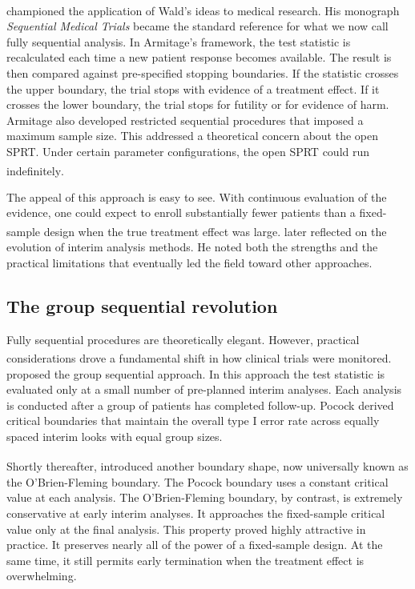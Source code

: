 \documentclass[
  11pt,
]{article}
\begin{document}
\textsuperscript{} championed the application of
Wald's ideas to medical research. His monograph
\emph{Sequential Medical Trials} became the standard
reference for what we now call fully sequential
analysis. In Armitage's framework, the test statistic
is recalculated each time a new patient response
becomes available. The result is then compared against
pre-specified stopping boundaries. If the statistic
crosses the upper boundary, the trial stops with
evidence of a treatment effect. If it crosses the lower
boundary, the trial stops for futility or for evidence
of harm. Armitage also developed restricted sequential
procedures that imposed a maximum sample size. This
addressed a theoretical concern about the open SPRT.
Under certain parameter configurations, the open SPRT
could run indefinitely\textsuperscript{}.

The appeal of this approach is easy to see. With
continuous evaluation of the evidence, one could expect
to enroll substantially fewer patients than a
fixed-sample design when the true treatment effect was
large.\textsuperscript{} later reflected on the
evolution of interim analysis methods. He noted both
the strengths and the practical limitations that
eventually led the field toward other approaches.

\subsection{The group sequential revolution}\label{the-group-sequential-revolution}

Fully sequential procedures are theoretically elegant.
However, practical considerations drove a fundamental
shift in how clinical trials were monitored.\textsuperscript{} proposed the group sequential
approach. In this approach the test statistic is
evaluated only at a small number of pre-planned interim
analyses. Each analysis is conducted after a group of
patients has completed follow-up. Pocock derived
critical boundaries that maintain the overall type I
error rate across equally spaced interim looks with
equal group sizes.

Shortly thereafter,\textsuperscript{} introduced
another boundary shape, now universally known as the
O'Brien-Fleming boundary. The Pocock boundary uses a
constant critical value at each analysis. The
O'Brien-Fleming boundary, by contrast, is extremely
conservative at early interim analyses. It approaches
the fixed-sample critical value only at the final
analysis. This property proved highly attractive in
practice. It preserves nearly all of the power of a
fixed-sample design. At the same time, it still permits
early termination when the treatment effect is
overwhelming.
\end{document}
